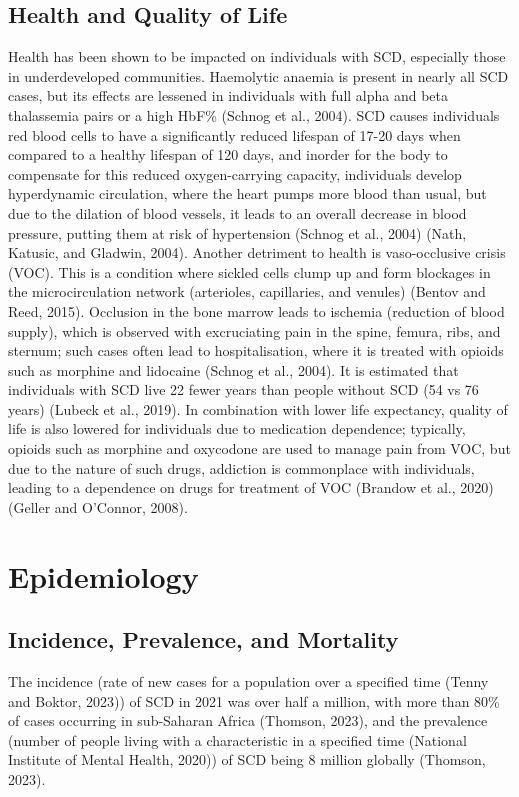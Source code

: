 \documentclass{mva_style}
\begin{document}
\subsection{Health and Quality of Life}
Health has been shown to be impacted on individuals with SCD, especially those in underdeveloped communities. Haemolytic anaemia is present in nearly all SCD cases, but its effects are lessened in individuals with full alpha and beta thalassemia pairs or a high HbF\% (Schnog et al., 2004). SCD causes individuals red blood cells to have a significantly reduced lifespan of 17-20 days when compared to a healthy lifespan of 120 days, and inorder for the body to compensate for this reduced oxygen-carrying capacity, individuals develop hyperdynamic circulation, where the heart pumps more blood than usual, but due to the dilation of blood vessels, it leads to an overall decrease in blood pressure, putting them at risk of hypertension (Schnog et al., 2004) (Nath, Katusic, and Gladwin, 2004).
Another detriment to health is vaso-occlusive crisis (VOC). This is a condition where sickled cells clump up and form blockages in the microcirculation network (arterioles, capillaries, and venules) (Bentov and Reed, 2015). Occlusion in the bone marrow leads to ischemia (reduction of blood supply), which is observed with excruciating pain in the spine, femura, ribs, and sternum; such cases often lead to hospitalisation, where it is treated with opioids such as morphine and lidocaine (Schnog et al., 2004).
It is estimated that individuals with SCD live 22 fewer years than people without SCD (54 vs 76 years) (Lubeck et al., 2019). In combination with lower life expectancy, quality of life is also lowered for individuals due to medication dependence; typically, opioids such as morphine and oxycodone are used to manage pain from VOC, but due to the nature of such drugs, addiction is commonplace with individuals, leading to a dependence on drugs for treatment of VOC (Brandow et al., 2020) (Geller and O’Connor, 2008).

\section{Epidemiology}
\subsection{Incidence, Prevalence, and Mortality}
The incidence (rate of new cases for a population over a specified time (Tenny and Boktor, 2023)) of SCD in 2021 was over half a million, with more than 80\% of cases occurring in sub-Saharan Africa (Thomson, 2023), and the prevalence (number of people living with a characteristic in a specified time (National Institute of Mental Health, 2020)) of SCD being 8 million globally (Thomson, 2023).
\end{document}
